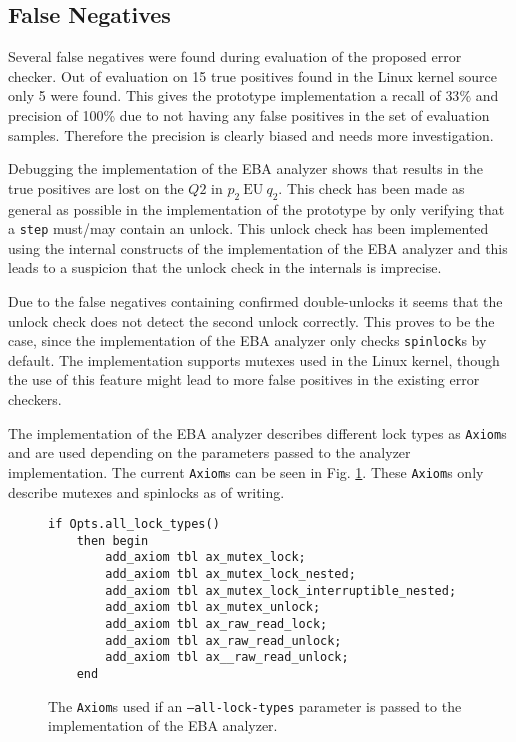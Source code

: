 \subsection{False Negatives}

Several false negatives were found during evaluation of the proposed error checker. Out of evaluation on 15 true positives found in the Linux kernel source only 5 were found. This gives the prototype implementation a recall of $33\%$ and precision of 100\% due to not having any false positives in the set of evaluation samples. Therefore the precision is clearly biased and needs more investigation. 

\newpar Debugging the implementation of the EBA analyzer shows that results in the true positives are lost on the $Q2$ in $p_2\:\mathrm{EU}\:q_2$. This check has been made as general as possible in the implementation of the prototype by only verifying that a \texttt{step} must/may contain an unlock. This unlock check has been implemented using the internal constructs of the implementation of the EBA analyzer and this leads to a suspicion that the unlock check in the internals is imprecise. 

\newpar Due to the false negatives containing confirmed double-unlocks it seems that the unlock check does not detect the second unlock correctly. This proves to be the case, since the implementation of the EBA analyzer only checks \texttt{spinlock}s by default. The implementation supports mutexes used in the Linux kernel, though the use of this feature might lead to more false positives in the existing error checkers. 

\newpar The implementation of the EBA analyzer describes different lock types as \texttt{Axiom}s and are used depending on the parameters passed to the analyzer implementation. The current \texttt{Axiom}s can be seen in Fig. \ref{axioms}. These \texttt{Axiom}s only describe mutexes and spinlocks as of writing. 

\begin{figure}[H]
\centering
\begin{verbatim}
if Opts.all_lock_types()
    then begin
        add_axiom tbl ax_mutex_lock;
        add_axiom tbl ax_mutex_lock_nested;
        add_axiom tbl ax_mutex_lock_interruptible_nested;
        add_axiom tbl ax_mutex_unlock;
        add_axiom tbl ax_raw_read_lock;
        add_axiom tbl ax_raw_read_unlock;
        add_axiom tbl ax__raw_read_unlock;
    end
\end{verbatim}
\caption{The \texttt{Axiom}s used if an \texttt{--all-lock-types} parameter is passed to the implementation of the EBA analyzer.}
\label{axioms}
\end{figure}

